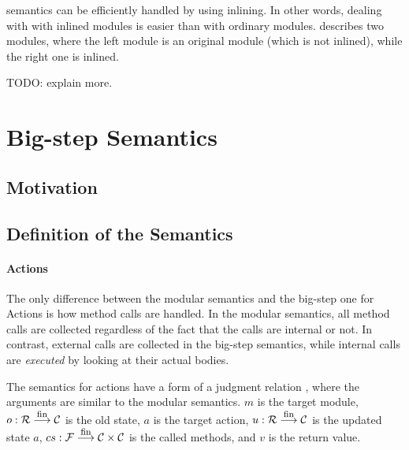 \Step{} semantics can be efficiently handled by using inlining. In
other words, dealing with \Step{} with inlined modules is easier than
with ordinary modules.  describes two
modules, where the left module is an original module (which is not
inlined), while the right one is inlined.

TODO: explain more.

\section{Big-step Semantics}

\subsection{Motivation}

\subsection{Definition of the Semantics}

\paragraph{Actions}

The only difference between the modular semantics and the big-step one
for Actions is how method calls are handled. In the modular semantics,
all method calls are collected regardless of the fact that the calls
are internal or not. In contrast, external calls are collected in the
big-step semantics, while internal calls are \emph{executed} by
looking at their actual bodies.

The semantics for actions have a form of a judgment relation
, where the arguments are similar to the
modular semantics. $m$ is the target module, $o : \mathcal{R} \stackrel{\textrm{\footnotesize{fin}}}{\longrightarrow} \mathcal{C}{}$ is the
old state, $a$ is the target action, $u : \mathcal{R} \stackrel{\textrm{\footnotesize{fin}}}{\longrightarrow} \mathcal{C}{}$ is the updated
state $a$, $cs : \mathcal{F} \stackrel{\textrm{\footnotesize{fin}}}{\longrightarrow} \mathcal{C} \times \mathcal{C}{}$ is the called methods, and $v$ is the
return value.

